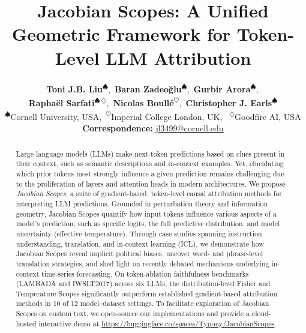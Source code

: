 \documentclass{article}
\title{Jacobian Scopes: A Unified Geometric Framework for Token-Level LLM Attribution}
\author{%
  \textbf{Toni J.B. Liu}\textsuperscript{$\spadesuit$},\,
  \textbf{Baran Zadeoğlu}\textsuperscript{$\spadesuit$},\,
  \textbf{Gurbir Arora}\textsuperscript{$\spadesuit$},\,
  \\
  \textbf{Raphaël Sarfati}\textsuperscript{$\spadesuit\,\diamondsuit$},\,
  \textbf{Nicolas Boullé}\textsuperscript{$\heartsuit$},\,
  \textbf{Christopher J. Earls}\textsuperscript{$\spadesuit$}
\\
  \textsuperscript{$\spadesuit$}Cornell University, USA,\,
  \textsuperscript{$\heartsuit$}Imperial College London, UK, \,
  \textsuperscript{$\diamondsuit$}Goodfire AI, USA
\\
  \small{
    \textbf{Correspondence:} \href{mailto:jl3499@cornell.edu}{jl3499@cornell.edu}
  }
}
\begin{document}
\maketitle
\begin{abstract}
Large language models (LLMs) make next-token predictions based on clues present in their
context, such as semantic descriptions and in-context examples. Yet, elucidating which prior
tokens most strongly influence a given prediction remains challenging due to the proliferation of layers and attention heads in modern
architectures. We propose \emph{Jacobian Scopes},
a suite of gradient-based, token-level causal
attribution methods for interpreting LLM predictions. Grounded in perturbation theory and
information geometry, Jacobian Scopes quantify how input tokens influence various aspects
of a model’s prediction, such as specific logits, the full predictive distribution, and model
uncertainty (effective temperature). Through
case studies spanning instruction understanding, translation, and in-context learning (ICL),
we demonstrate how Jacobian Scopes reveal
implicit political biases, uncover word- and
phrase-level translation strategies, and shed
light on recently debated mechanisms underlying in-context time-series forecasting.
On token-ablation faithfulness benchmarks (LAMBADA and IWSLT2017) across six LLMs, the distribution-level Fisher and Temperature Scopes significantly outperform established gradient-based attribution methods in 10 of 12 model--dataset settings.
To facilitate exploration of Jacobian Scopes on custom text, we open-source our implementations and provide a cloud-hosted interactive demo at \url{https://huggingface.co/spaces/Typony/JacobianScopes}.
\end{abstract}
\end{document}
